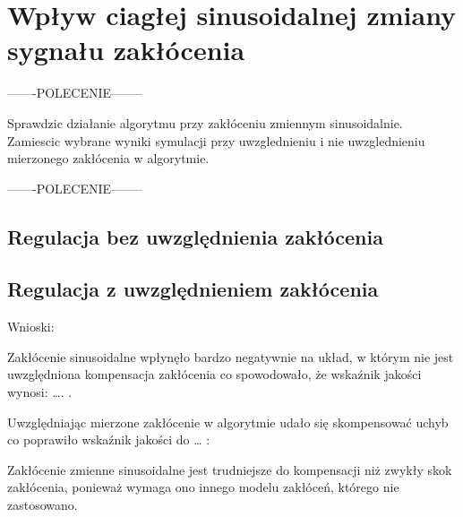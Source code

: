 \section{Wpływ ciagłej sinusoidalnej zmiany sygnału zakłócenia}
\label{projekt:zad6}

-------POLECENIE--------

Sprawdzic działanie algorytmu przy zakłóceniu zmiennym sinusoidalnie. Zamiescic wybrane
wyniki symulacji przy uwzglednieniu i nie uwzglednieniu mierzonego zakłócenia
w algorytmie.

-------POLECENIE--------


\subsection{Regulacja bez uwzględnienia zakłócenia}
\label{projekt:zad6:regulacjaBezUwzg}

\subsection{Regulacja z uwzględnieniem zakłócenia}
\label{projekt:zad6:regulacjaZUwzg}

Wnioski: 

Zakłócenie sinusoidalne wpłynęło bardzo negatywnie na układ, 
w którym nie jest uwzględniona kompensacja zakłócenia co spowodowało, 
że wskaźnik jakości wynosi: …. . 

Uwzględniając mierzone zakłócenie w algorytmie udało się skompensować uchyb co poprawiło wskaźnik jakości do … :

Zakłócenie zmienne sinusoidalne jest trudniejsze do kompensacji niż zwykły skok zakłócenia, 
ponieważ wymaga ono innego modelu zakłóceń, którego nie zastosowano.
